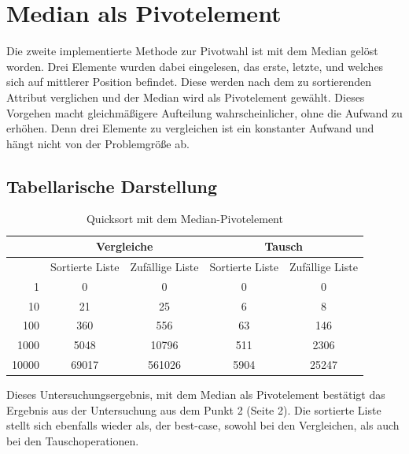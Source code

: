 \documentclass[12pt]{article}
\begin{document}
\newpage
\section{Median als Pivotelement}
Die zweite implementierte Methode zur Pivotwahl ist mit dem Median gelöst worden. Drei Elemente wurden dabei eingelesen, das erste, letzte, und welches sich auf mittlerer Position befindet. Diese werden nach dem zu sortierenden Attribut verglichen und der Median wird als Pivotelement gewählt. Dieses Vorgehen macht gleichmäßigere Aufteilung wahrscheinlicher, ohne die Aufwand zu erhöhen. Denn drei Elemente zu vergleichen ist ein konstanter Aufwand und hängt nicht von der Problemgröße ab.

\subsection{Tabellarische Darstellung}

\begin{table}[ht]
\centering
\caption{Quicksort mit dem Median-Pivotelement}
\begin{tabular}{r|c|c|c|c}
\multicolumn{1}{l|}{} & \multicolumn{2}{c|}{\textbf{Vergleiche}} & \multicolumn{2}{c|}{\textbf{Tausch}} \\ \hline
\rowcolor[HTML]{EFEFEF} 
\multicolumn{1}{l|}{\cellcolor[HTML]{EFEFEF}Größe} & Sortierte Liste & Zufällige Liste & Sortierte Liste & Zufällige Liste \\ \hline
1 & 0 & 0 & 0 & 0 \\ \hline
10 & 21 & 25 & 6 & 8 \\ \hline
100 & 360 & 556 & 63 & 146 \\ \hline
1000 & 5048 & 10796 & 511 & 2306 \\ \hline
10000 & 69017 & 561026 & 5904 & 25247
\end{tabular}
\end{table}
Dieses Untersuchungsergebnis, mit dem Median als Pivotelement bestätigt das Ergebnis aus der Untersuchung aus dem Punkt 2 (Seite 2). Die sortierte Liste stellt sich ebenfalls wieder als, der best-case, sowohl bei den Vergleichen, als auch bei den Tauschoperationen. 
\end{document}
